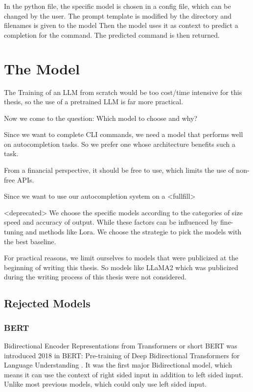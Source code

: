 In the python file, the specific model is chosen in a config file, which can be changed by the user.
The prompt template is modified by the directory and filenames is given to the model
Then the model uses it as context to predict  a completion for the command.
The predicted command is then returned.



\section{The Model}\raggedbottom
The Training of an LLM from scratch would be too  cost/time intensive for this thesis, so the use of a pretrained LLM is far more practical.


Now  we come to the question: Which model to choose and why? 

Since we want to complete CLI commands, we need a model that performs well on autocompletion tasks. So we prefer one whose architecture benefits such a task.


From a financial perspective, it should be free to use, which limits the use of non-free APIs.


Since we want to use our autocompletion system on a 
<fullfill>

<deprecated>
We choose the specific models according to the categories of size speed and accuracy of output. While these factors can be influenced by fine-tuning and methods like Lora. We choose the strategie to pick the models with the best baseline.


For practical reasons, we limit ourselves to models that were publicized at the beginning of writing this thesis. So models like LLaMA2 which was publicized during the writing process of this thesis were not considered.



\subsection{Rejected Models}


\subsubsection{BERT}
Bidirectional Encoder Representations from Transformers or short BERT was introduced  2018  in BERT: Pre-training of Deep Bidirectional Transformers for
Language Understanding \cite{devlin2019bert}. It was the first major Bidirectional model, which means it can use the context of right sided input in addition to left sided input. Unlike most previous models, which could only use left sided input.

